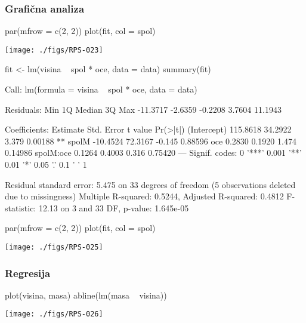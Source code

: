 \begin{frame}[fragile]
\frametitle{Grafična analiza}
\begin{Schunk}
\begin{Sinput}
  par(mfrow = c(2, 2))
  plot(fit, col = spol)
\end{Sinput}
\end{Schunk}
\texttt{[image: ./figs/RPS-023]}
\end{frame}


\begin{Schunk}
\begin{Sinput}
  fit <- lm(visina ~ spol * oce, data = data)
  summary(fit)
\end{Sinput}
\begin{Soutput}
Call:
lm(formula = visina ~ spol * oce, data = data)

Residuals:
     Min       1Q   Median       3Q      Max 
-11.3717  -2.6359  -0.2208   3.7604  11.1943 

Coefficients:
            Estimate Std. Error t value Pr(>|t|)   
(Intercept) 115.8618    34.2922   3.379  0.00188 **
spolM       -10.4524    72.3167  -0.145  0.88596   
oce           0.2830     0.1920   1.474  0.14986   
spolM:oce     0.1264     0.4003   0.316  0.75420   
---
Signif. codes:  0 '***' 0.001 '**' 0.01 '*' 0.05 '.' 0.1 ' ' 1 

Residual standard error: 5.475 on 33 degrees of freedom
  (5 observations deleted due to missingness)
Multiple R-squared: 0.5244,	Adjusted R-squared: 0.4812 
F-statistic: 12.13 on 3 and 33 DF,  p-value: 1.645e-05 
\end{Soutput}
\end{Schunk}

\begin{Schunk}
\begin{Sinput}
  par(mfrow = c(2, 2))
  plot(fit, col = spol)
\end{Sinput}
\end{Schunk}
\texttt{[image: ./figs/RPS-025]}


\begin{frame}[fragile]
\frametitle{Regresija}
\begin{Schunk}
\begin{Sinput}
  plot(visina, masa)
  abline(lm(masa ~ visina))
\end{Sinput}
\end{Schunk}
\texttt{[image: ./figs/RPS-026]}
\end{frame}

